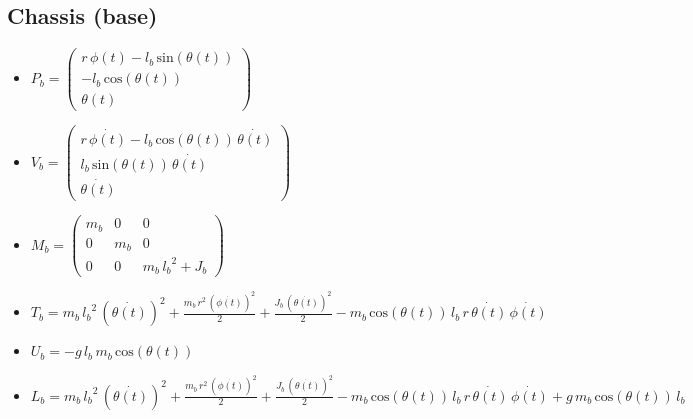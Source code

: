 \subsection{Chassis (base)}
\begin{itemize}
	\item \textbf{$P_b = \left(\begin{array}{c}
		r\,\phi \left(t\right)-l_b \,\mathrm{sin}\left(\theta \left(t\right)\right)\\
		-l_b \,\mathrm{cos}\left(\theta \left(t\right)\right)\\
		\theta \left(t\right)
		\end{array}\right)$}
	
	\item \textbf{$V_b = \left(\begin{array}{c}
		r\,\dot{\phi \left(t\right)}-l_b \,\mathrm{cos}\left(\theta \left(t\right)\right)\,\dot{\theta \left(t\right)}\\
		l_b \,\mathrm{sin}\left(\theta \left(t\right)\right)\,\dot{\theta \left(t\right)}\\
		\dot{\theta \left(t\right)}
		\end{array}\right)$}
	
	\item \textbf{$M_b = \left(\begin{array}{ccc}
		m_b  & 0 & 0\\
		0 & m_b  & 0\\
		0 & 0 & m_b \,{l_b }^2 +J_b 
		\end{array}\right)$}
	
	\item \textbf{$T_b = m_b \,{l_b }^2 \,{{\left(\dot{\theta \left(t\right)}\right)}}^2 +\frac{m_b \,r^2 \,{{\left(\dot{\phi \left(t\right)}\right)}}^2 }{2}+\frac{J_b \,{{\left(\dot{\theta \left(t\right)}\right)}}^2 }{2}-m_b \,\mathrm{cos}\left(\theta \left(t\right)\right)\,l_b \,r\,\dot{\theta \left(t\right)}\,\dot{\phi \left(t\right)}$}
	
	\item \textbf{$U_b = -g\,l_b \,m_b \,\mathrm{cos}\left(\theta \left(t\right)\right)$}
	
	\item \textbf{$L_b = m_b \,{l_b }^2 \,{{\left(\dot{\theta \left(t\right)}\right)}}^2 +\frac{m_b \,r^2 \,{{\left(\dot{\phi \left(t\right)}\right)}}^2 }{2}+\frac{J_b \,{{\left(\dot{\theta \left(t\right)}\right)}}^2 }{2}-m_b \,\mathrm{cos}\left(\theta \left(t\right)\right)\,l_b \,r\,\dot{\theta \left(t\right)}\,\dot{\phi \left(t\right)}+g\,m_b \,\mathrm{cos}\left(\theta \left(t\right)\right)\,l_b$}
\end{itemize}
